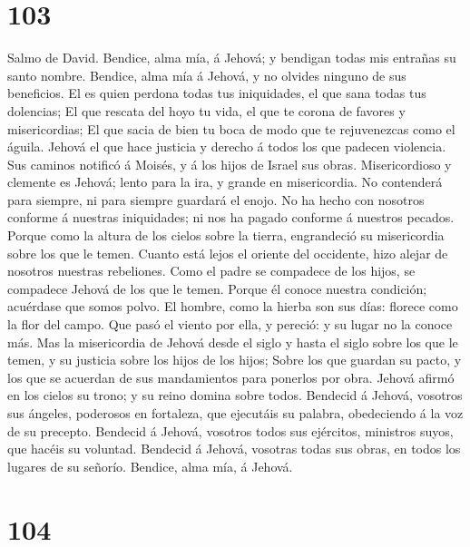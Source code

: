\hypertarget{section-102}{%
\section{103}\label{section-102}}

 Salmo de David. Bendice, alma mía, á Jehová; y bendigan
todas mis entrañas su santo nombre.  Bendice, alma mía á
Jehová, y no olvides ninguno de sus beneficios.  El es
quien perdona todas tus iniquidades, el que sana todas tus dolencias;
 El que rescata del hoyo tu vida, el que te corona de
favores y misericordias;  El que sacia de bien tu boca de
modo que te rejuvenezcas como el águila.  Jehová el que
hace justicia y derecho á todos los que padecen violencia.
 Sus caminos notificó á Moisés, y á los hijos de Israel
sus obras.  Misericordioso y clemente es Jehová; lento
para la ira, y grande en misericordia.  No contenderá para
siempre, ni para siempre guardará el enojo.  No ha hecho
con nosotros conforme á nuestras iniquidades; ni nos ha pagado conforme
á nuestros pecados.  Porque como la altura de los cielos
sobre la tierra, engrandeció su misericordia sobre los que le temen.
 Cuanto está lejos el oriente del occidente, hizo alejar
de nosotros nuestras rebeliones.  Como el padre se
compadece de los hijos, se compadece Jehová de los que le temen.
 Porque él conoce nuestra condición; acuérdase que somos
polvo.  El hombre, como la hierba son sus días: florece
como la flor del campo.  Que pasó el viento por ella, y
pereció: y su lugar no la conoce más.  Mas la
misericordia de Jehová desde el siglo y hasta el siglo sobre los que le
temen, y su justicia sobre los hijos de los hijos;  Sobre
los que guardan su pacto, y los que se acuerdan de sus mandamientos para
ponerlos por obra.  Jehová afirmó en los cielos su trono;
y su reino domina sobre todos.  Bendecid á Jehová,
vosotros sus ángeles, poderosos en fortaleza, que ejecutáis su palabra,
obedeciendo á la voz de su precepto.  Bendecid á Jehová,
vosotros todos sus ejércitos, ministros suyos, que hacéis su voluntad.
 Bendecid á Jehová, vosotras todas sus obras, en todos
los lugares de su señorío. Bendice, alma mía, á Jehová.

\hypertarget{section-103}{%
\section{104}\label{section-103}}

